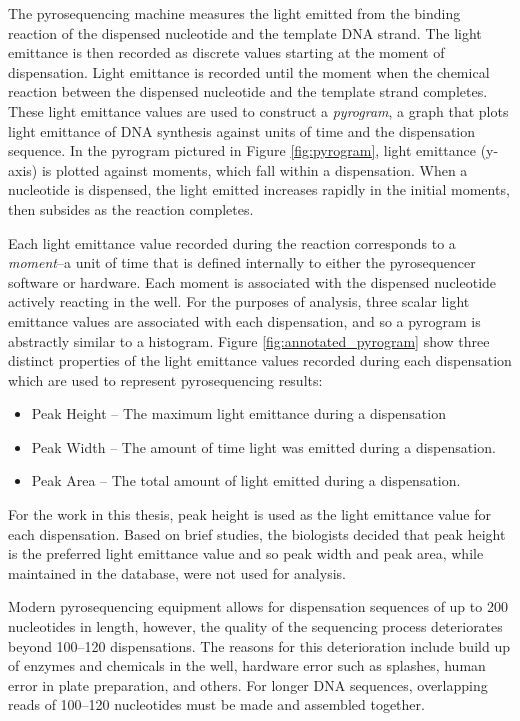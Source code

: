 \documentclass[12pt]{ucthesis}
\begin{document}
      The pyrosequencing machine measures the light emitted from the binding
      reaction of the dispensed nucleotide and the template DNA strand. The
      light emittance is then recorded as discrete values starting at the
      moment of dispensation. Light emittance is recorded until the moment when
      the chemical reaction between the dispensed nucleotide and the template
      strand completes. These light emittance values are used to construct a
      \textit{pyrogram}, a graph that plots light emittance of DNA synthesis
      against units of time and the dispensation sequence. In the pyrogram
      pictured in Figure \ref{fig:pyrogram}, light emittance (y-axis) is
      plotted against moments, which fall within a dispensation. When a
      nucleotide is dispensed, the light emitted increases rapidly in the
      initial moments, then subsides as the reaction completes.

      Each light emittance value recorded during the reaction corresponds to a
      \textit{moment}--a unit of time that is defined internally to either the
      pyrosequencer software or hardware. Each moment is associated with the
      dispensed nucleotide actively reacting in the well. For the purposes of
      analysis, three scalar light emittance values are associated with each
      dispensation, and so a pyrogram is abstractly similar to a histogram.
      Figure \ref{fig:annotated_pyrogram} show three distinct properties of the
      light emittance values recorded during each dispensation which are used
      to represent pyrosequencing results:
      \begin{itemize}
         \item Peak Height -- The maximum light emittance during a dispensation
         \item Peak Width -- The amount of time light was emitted during a
                             dispensation.
         \item Peak Area -- The total amount of light emitted during a
                            dispensation.
      \end{itemize}
      For the work in this thesis, peak height is used as the light emittance
      value for each dispensation. Based on brief studies, the biologists
      decided that peak height is the preferred light emittance value and so
      peak width and peak area, while maintained in the database, were not used
      for analysis.

      Modern pyrosequencing equipment allows for dispensation sequences of up
      to 200 nucleotides in length, however, the quality of the sequencing
      process deteriorates beyond 100--120 dispensations. The reasons for this
      deterioration include build up of enzymes and chemicals in the well,
      hardware error such as splashes, human error in plate preparation, and
      others. For longer DNA sequences, overlapping reads of 100--120
      nucleotides must be made and assembled together.
\end{document}
